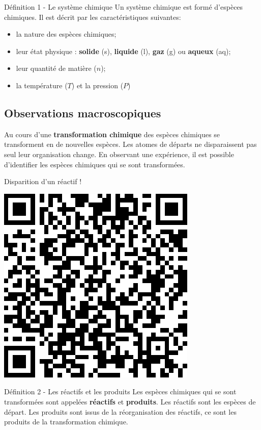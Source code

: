 \documentclass[french, a4paper, 12pt, twocolumn, landscape]{article}
\begin{document}
\begin{definition}{Définition 1 - Le système chimique}
	Un système chimique est formé d'espèces chimiques. Il est décrit par les caractéristiques suivantes:
	\begin{itemize}
		\item la nature des espèces chimiques;
		\item leur état physique : \textbf{solide} (s), \textbf{liquide} (l), \textbf{gaz} (g) ou \textbf{aqueux} (aq);
		\item leur quantité de matière ($n$);
		\item la température ($T$) et la pression ($P$)
	\end{itemize}
\end{definition}

\subsection{Observations macroscopiques}

\begin{minipage}{.63\linewidth}
	Au cours d'une \textbf{transformation chimique} des espèces chimiques se transforment en de nouvelles espèces. Les atomes de départs ne disparaissent pas seul leur organisation change. En observant une expérience, il est possible d'identifier les espèces chimiques qui se sont transformées.
\end{minipage}\hfill
\begin{minipage}{.32\linewidth}

	Disparition d'un réactif !

	\centering
	\includegraphics[width=.5\linewidth]{AcideOxalique.png}
\end{minipage}

\begin{definition}{Définition 2 - Les réactifs et les produits}
	Les espèces chimiques qui se sont transformées sont appelées \textbf{réactifs} et \textbf{produits}. Les réactifs sont les espèces de départ. Les produits sont issus de la réorganisation des réactifs, ce sont les produits de la transformation chimique.
\end{definition}
\end{document}
